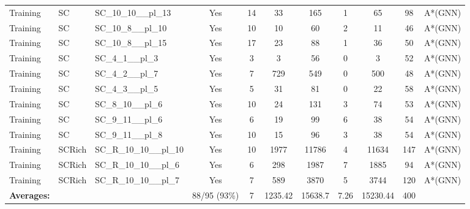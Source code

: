 \documentclass{article}
\begin{document}
\begin{tabular}{lllcccccccc}
Training & SC & SC\_10\_10\_\_pl\_13 & Yes & 14 & 33 & 165 & 1 & 65 & 98 & A*(GNN) \\
Training & SC & SC\_10\_8\_\_pl\_10 & Yes & 10 & 10 & 60 & 2 & 11 & 46 & A*(GNN) \\
Training & SC & SC\_10\_8\_\_pl\_15 & Yes & 17 & 23 & 88 & 1 & 36 & 50 & A*(GNN) \\
Training & SC & SC\_4\_1\_\_pl\_3 & Yes & 3 & 3 & 56 & 0 & 3 & 52 & A*(GNN) \\
Training & SC & SC\_4\_2\_\_pl\_7 & Yes & 7 & 729 & 549 & 0 & 500 & 48 & A*(GNN) \\
Training & SC & SC\_4\_3\_\_pl\_5 & Yes & 5 & 31 & 81 & 0 & 22 & 58 & A*(GNN) \\
Training & SC & SC\_8\_10\_\_pl\_6 & Yes & 10 & 24 & 131 & 3 & 74 & 53 & A*(GNN) \\
Training & SC & SC\_9\_11\_\_pl\_6 & Yes & 6 & 19 & 99 & 6 & 38 & 54 & A*(GNN) \\
Training & SC & SC\_9\_11\_\_pl\_8 & Yes & 10 & 15 & 96 & 3 & 38 & 54 & A*(GNN) \\
Training & SCRich & SC\_R\_10\_10\_\_pl\_10 & Yes & 10 & 1977 & 11786 & 4 & 11634 & 147 & A*(GNN) \\
Training & SCRich & SC\_R\_10\_10\_\_pl\_6 & Yes & 6 & 298 & 1987 & 7 & 1885 & 94 & A*(GNN) \\
Training & SCRich & SC\_R\_10\_10\_\_pl\_7 & Yes & 7 & 589 & 3870 & 5 & 3744 & 120 & A*(GNN) \\
\textbf{Averages:} & & & 88/95 (93\%) & 7 & 1235.42 & 15638.7 & 7.26 & 15230.44 & 400 & \\
\bottomrule
\end{tabular}
\newpage
\end{document}
